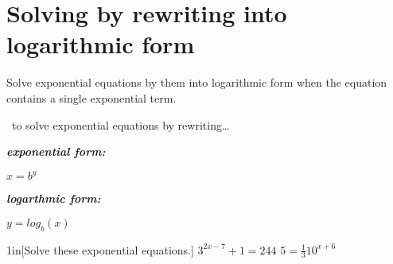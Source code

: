 \section{Solving by rewriting into logarithmic form}

Solve exponential equations by  them into logarithmic form 
when the equation contains a single exponential term.

\begin{myConceptSteps}{~to solve exponential equations by rewriting\dots}
\end{myConceptSteps}

\begin{tcbraster}[
    raster equal height,
    raster columns=2,
    raster left skip = 1in, raster right skip=1in, raster column skip=1in,
]
\begin{tcolorbox}
    \centering\large
    {\bfseries\itshape exponential form:}

    $ x = b^y$
\end{tcolorbox}
\begin{tcolorbox}
    \centering\large
    {\bfseries\itshape logarthmic form:}

    $ y = log_b(x)$
\end{tcolorbox}
\end{tcbraster}


\begin{my2Problems}[\normalsize]{1in}[Solve these exponential equations.]
    {
        $3^{2x-7} + 1 = 244$
    }
    {
        $5 = \frac{1}{3} 10^{x+6}$
    }
\end{my2Problems}
